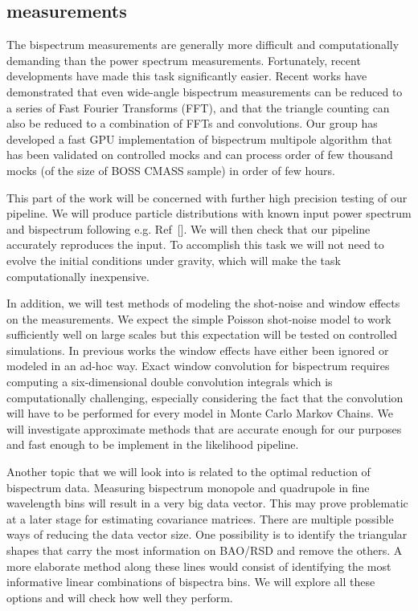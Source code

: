 \subsection*{measurements}

The bispectrum measurements are generally more difficult and computationally
demanding than the power spectrum measurements. Fortunately, recent
developments have made this task significantly easier. Recent works have
demonstrated that even wide-angle bispectrum measurements can be reduced to a
series of Fast Fourier Transforms (FFT), and that the triangle counting can
also be reduced  to a combination of FFTs and convolutions. Our group has
developed a fast GPU implementation of bispectrum multipole algorithm that has
been validated on controlled mocks and can process order of few thousand mocks
(of the size of BOSS CMASS sample) in order of few hours.

This part of the work will be concerned with further high precision testing of
our pipeline. We will produce particle distributions with known input power
spectrum and bispectrum following e.g. Ref~[]. We will then check that our
pipeline accurately reproduces the input. To accomplish this task we will not
need to evolve the initial conditions under gravity, which will make the task
computationally inexpensive. 

In addition, we will test methods of modeling the shot-noise and window effects
on the measurements. We expect the simple Poisson shot-noise model to work
sufficiently well on large scales but this expectation will be tested on
controlled simulations. In previous works the window effects have either been
ignored or modeled in an ad-hoc way. Exact window convolution for bispectrum
requires computing a six-dimensional double convolution integrals which is
computationally challenging, especially considering the fact that the
convolution will have to be performed for every model in Monte Carlo Markov
Chains. We will investigate approximate methods that are accurate enough for our
purposes and fast enough to be implement in the likelihood pipeline. 

Another topic that we will look into is related to the optimal reduction of
bispectrum data. Measuring bispectrum monopole and quadrupole in fine
wavelength bins will result in a very big data vector. This may prove
problematic at a later stage for estimating covariance matrices. There are
multiple possible ways of reducing the data vector size. One possibility is to
identify the triangular shapes that carry the most information on BAO/RSD and
remove the others. A more elaborate method along these lines would consist of
identifying the most informative linear combinations of bispectra bins. We will
explore all these options and will check how well they perform.

